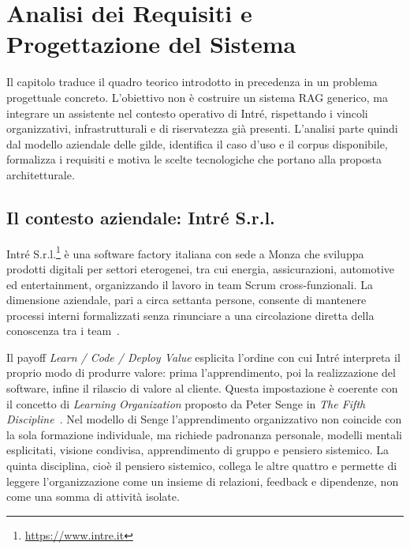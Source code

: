 \pagestyle{mystyle}
\chapter{Analisi dei Requisiti e Progettazione del Sistema}
\label{chap:requirements_design}
\label{chap:progettazione}

Il capitolo traduce il quadro teorico introdotto in precedenza in un problema
progettuale concreto. L'obiettivo non è costruire un sistema RAG generico, ma
integrare un assistente nel contesto operativo di Intré, rispettando i vincoli
organizzativi, infrastrutturali e di riservatezza già presenti. L'analisi
parte quindi dal modello aziendale delle gilde, identifica il caso d'uso e
il corpus disponibile, formalizza i requisiti e motiva le
scelte tecnologiche che portano alla proposta architetturale.

\section{Il contesto aziendale: Intré S.r.l.}
\label{sec:intre_context}
Intré S.r.l.\footnote{\url{https://www.intre.it}} è una software factory
italiana con sede a Monza che sviluppa prodotti digitali per settori eterogenei,
tra cui energia, assicurazioni, automotive ed entertainment, organizzando il
lavoro in team Scrum cross-funzionali. La dimensione aziendale, pari a circa
settanta persone, consente di mantenere processi interni formalizzati senza
rinunciare a una circolazione diretta della conoscenza tra i
team~\cite{intre_learning_organization}.

Il payoff \emph{Learn / Code / Deploy Value} esplicita l'ordine con cui Intré
interpreta il proprio modo di produrre valore: prima l'apprendimento, poi la
realizzazione del software, infine il rilascio di valore al cliente. Questa
impostazione è coerente con il concetto di \textit{Learning Organization}
proposto da Peter Senge in \emph{The Fifth Discipline}~\cite{senge1990fifth}.
Nel modello di Senge l'apprendimento organizzativo non coincide con la sola
formazione individuale, ma richiede padronanza personale, modelli mentali
esplicitati, visione condivisa, apprendimento di gruppo e pensiero sistemico.
La quinta disciplina, cioè il pensiero sistemico, collega le altre quattro e
permette di leggere l'organizzazione come un insieme di relazioni, feedback e
dipendenze, non come una somma di attività isolate.


